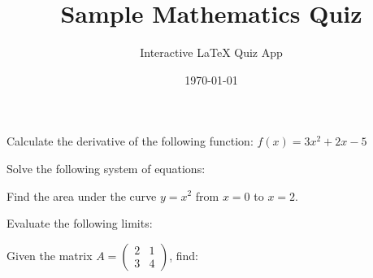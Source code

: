 \documentclass[12pt]{exam}
\title{Sample Mathematics Quiz}
\author{Interactive LaTeX Quiz App}
\date{\today}
\begin{document}
\maketitle

\begin{questions}

\question Calculate the derivative of the following function: $f(x) = 3x^2 + 2x - 5$

\question Solve the following system of equations:

\question Find the area under the curve $y = x^2$ from $x = 0$ to $x = 2$.

\question Evaluate the following limits:

\question Given the matrix $A = \begin{pmatrix} 2 & 1 \\ 3 & 4 \end{pmatrix}$, find:


\end{questions}
\end{document}

